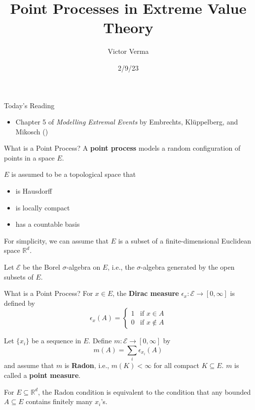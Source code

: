 \documentclass{beamer}
\title[Point Processes in Extreme Value Theory]{Point Processes in Extreme Value Theory}
\author{Victor Verma}
\institute[]
{
Prof. Yang Chen's Reading Group \\
Department of Statistics \\
University of Michigan
}
\date[2/9/23]{2/9/23}
\begin{document}
\begin{frame}
    \titlepage
\end{frame}

\begin{frame}{Today's Reading}
    \begin{itemize}
        \item Chapter 5 of \textit{Modelling Extremal Events} by Embrechts, Kl\"{u}ppelberg, and Mikosch (\cite{embrechts_et_al_1997})
    \end{itemize}
\end{frame}



\begin{frame}{What is a Point Process?}
    A \textbf{point process} models a random configuration of points in a space $E$.

    \smallskip

    $E$ is assumed to be a topological space that
    \begin{itemize}
        \item is Hausdorff
        \item is locally compact
        \item has a countable basis
    \end{itemize}
    For simplicity, we can assume that $E$ is a subset of a finite-dimensional Euclidean space $\mathbb{R}^d$.

    \smallskip
    
    Let $\mathcal{E}$ be the Borel $\sigma$-algebra on $E$, i.e., the $\sigma$-algebra generated by the open subsets of $E$.
\end{frame}

\begin{frame}{What is a Point Process?}
    For $x \in E$, the \textbf{Dirac measure} $\epsilon_x : \mathcal{E} \to [0, \infty]$ is defined by
    \[
    \epsilon_x(A) =
        \begin{cases}
             1 & \text{if $x \in A$} \\
             0 & \text{if $x \notin A$}
        \end{cases}
    \]

    \smallskip

    Let $\{x_i\}$ be a sequence in $E$. Define $m : \mathcal{E} \to [0, \infty]$ by
    \[
    m(A) = \sum_i \epsilon_{x_i}(A)
    \]
    and assume that $m$ is \textbf{Radon}, i.e., $m(K) < \infty$ for all compact $K \subseteq E$. $m$ is called a \textbf{point measure}.

    \smallskip

    For $E \subseteq \mathbb{R}^d$, the Radon condition is equivalent to the condition that any bounded $A \subseteq E$ contains finitely many $x_i$'s.
\end{frame}
\end{document}
